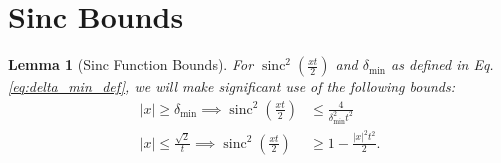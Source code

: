\documentclass[
 amsmath,amssymb,
 aps,
onecolumn, 
nofootinbib]{revtex4-2}
\newtheorem{lemma}[theorem]{Lemma}
\DeclareMathOperator{\sinc}{sinc}
\begin{document}
\section{Sinc Bounds} \label{sec:appendix_sinc}

\begin{lemma}[Sinc Function Bounds] \label{lem:sinc_poly_approx}
    For $\sinc^2\left( \frac{x t}{2} \right)$ and $\delta_{\min}$ as defined in Eq. \eqref{eq:delta_min_def}, we will make significant use of the following bounds:
    \begin{align}
        |x| \ge \delta_{\min} \implies \sinc^2 \left( \frac{x t}{2} \right) &\le \frac{4}{\delta_{\min}^2 t^2} \label{eq:sinc_upper_bound} \\
        |x| \le \frac{\sqrt{2}}{t} \implies \sinc^2\left(\frac{x t}{2} \right) &\ge 1 - \frac{|x|^2 t^2}{2}. \label{eq:sinc_lower_bound}
\end{align}

\end{lemma}
\end{document}
